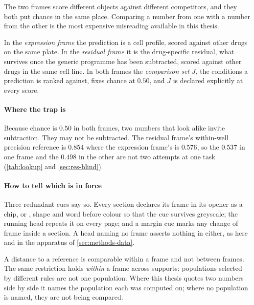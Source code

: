 \noindent
The two frames score different objects against different competitors, and they
both put chance in the same place. Comparing a number from one with a number
from the other is the most expensive misreading available in this
thesis.

In the \Eframe{} \emph{expression frame} the prediction is a cell profile,
scored against other drugs on the same plate. In the \Rframe{} \emph{residual
frame} it is the drug-specific residual, what survives once the generic
programme has been subtracted, scored against other drugs in the same cell
line. In both frames the \emph{comparison set} $J$, the conditions a prediction
is ranked against, fixes chance at $0.50$, and $J$ is declared explicitly at
every score.

\paragraph{Where the trap is} Because chance is $0.50$ in both frames, two
numbers that look alike invite subtraction. They may not be subtracted.
The residual frame's within-well precision reference is $0.854$
where the expression frame's is $0.576$, so the $0.537$ in one frame and the
$0.498$ in the other are not two attempts at one task
(\cref{tab:lookup} and \cref{sec:res-blind}).

\paragraph{How to tell which is in force} Three redundant cues say so. Every
section declares its frame in its opener as a chip, \Eframe{} or
\Rframe{}, shape and word before colour so that the cue survives greyscale; the
running head repeats it on every page; and a margin cue marks any change of
frame inside a section. A head naming no frame asserts nothing in either, as
here and in the apparatus of \cref{sec:methods-data}.

%
\begin{scopelimit}
A distance to a reference is comparable within a frame and not between frames.
The same restriction holds \emph{within} a frame across
supports: populations selected by different rules are not one population. Where
this thesis quotes two numbers side by side it names the population each was
computed on; where no population is named, they are not being compared.
\end{scopelimit}

